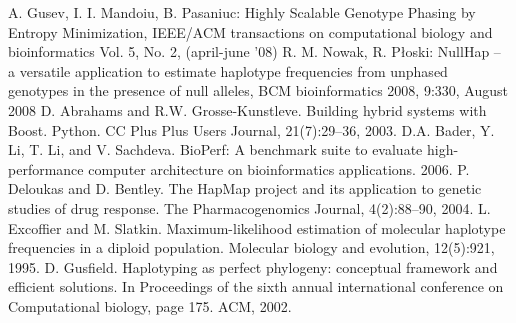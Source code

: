 \documentclass{llncs}
\begin{document}
\begin{thebibliography}{99}

 A. Gusev, I. I. Mandoiu, B. Pasaniuc: Highly Scalable Genotype Phasing by Entropy Minimization, IEEE/ACM transactions on computational biology and bioinformatics Vol. 5, No. 2, (april-june ’08)
 R. M. Nowak, R. Płoski: NullHap – a versatile application to estimate haplotype frequencies from unphased genotypes in the presence of null alleles, BCM bioinformatics 2008, 9:330, August 2008
 D. Abrahams and R.W. Grosse-Kunstleve. Building hybrid systems with Boost. Python. CC Plus Plus Users Journal, 21(7):29–36, 2003.
 D.A. Bader, Y. Li, T. Li, and V. Sachdeva. BioPerf: A benchmark suite to evaluate high-performance computer architecture on bioinformatics applications. 2006.
 P. Deloukas and D. Bentley. The HapMap project and its application to genetic studies of drug response. The Pharmacogenomics Journal, 4(2):88–90, 2004.
 L. Excoffier and M. Slatkin. Maximum-likelihood estimation of molecular haplotype frequencies in a diploid population. Molecular biology and evolution, 12(5):921, 1995.
 D. Gusfield. Haplotyping as perfect phylogeny: conceptual framework and efficient solutions. In Proceedings of the sixth annual international conference on Computational biology, page 175. ACM, 2002.

\end{thebibliography}
\end{document}
